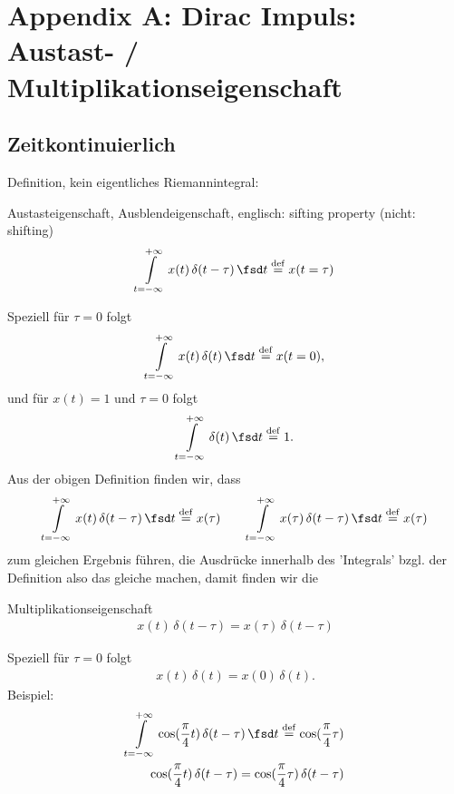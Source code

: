 \clearpage
\section{Appendix A: Dirac Impuls: Austast- / Multiplikationseigenschaft}
%
\subsection{Zeitkontinuierlich}
Definition, kein eigentliches Riemannintegral:
\begin{mdframed}
Austasteigenschaft, Ausblendeigenschaft, englisch: sifting property (nicht: shifting)
\begin{align}
\int\limits_{t=-\infty}^{+\infty} x(t) \, \delta(t-\tau) \, \fsd t \stackrel{\mathrm{def}}= x(t=\tau)
\label{eq:AppA_SifitingCT}
\end{align}
\end{mdframed}
Speziell für $\tau=0$ folgt
\begin{align}
\int\limits_{t=-\infty}^{+\infty} x(t) \, \delta(t) \, \fsd t \stackrel{\mathrm{def}}= x(t=0),
\end{align}
und für $x(t)=1$ und $\tau=0$ folgt
\begin{align}
\int\limits_{t=-\infty}^{+\infty} \delta(t) \, \fsd t \stackrel{\mathrm{def}}= 1.
\end{align}
Aus der obigen Definition finden wir, dass
\begin{align}
\int\limits_{t=-\infty}^{+\infty} x(t) \, \delta(t-\tau) \, \fsd t \stackrel{\mathrm{def}}= x(\tau)\qquad
\int\limits_{t=-\infty}^{+\infty} x(\tau) \, \delta(t-\tau) \, \fsd t \stackrel{\mathrm{def}}= x(\tau)
\end{align}
zum gleichen Ergebnis führen, die Ausdrücke innerhalb des 'Integrals' bzgl.
der Definition also das gleiche machen, damit finden wir die
\begin{mdframed}
Multiplikationseigenschaft
\begin{align}
x(t) \, \delta(t-\tau) = x(\tau) \, \delta(t-\tau)
\end{align}
\end{mdframed}
Speziell für $\tau=0$ folgt
\begin{align}
x(t) \, \delta(t) = x(0) \, \delta(t).
\end{align}
%
Beispiel:
\begin{align}
\int\limits_{t=-\infty}^{+\infty} \cos(\frac{\pi}{4} t) \, \delta(t-\tau) \, \fsd t \stackrel{\mathrm{def}}=\cos(\frac{\pi}{4} \tau)\\
\cos(\frac{\pi}{4} t) \, \delta(t-\tau) = \cos(\frac{\pi}{4} \tau) \, \delta(t-\tau)
\end{align}
